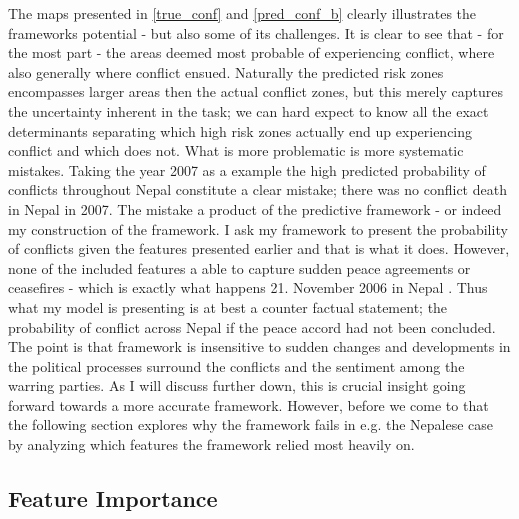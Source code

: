 \documentclass[a4paper]{article}
\begin{document}
The maps presented in \autoref{true_conf} and \autoref{pred_conf_b} clearly illustrates the frameworks potential - but also some of its challenges. It is clear to see that - for the most part - the areas deemed most probable of experiencing conflict, where also generally where conflict ensued. Naturally the predicted risk zones encompasses larger areas then the actual conflict zones, but this merely captures the uncertainty inherent in the task; we can hard expect to know all the exact determinants separating which high risk zones actually end up experiencing conflict and which does not. What is more problematic is more systematic mistakes. Taking the year 2007 as a example the high predicted probability of conflicts throughout Nepal constitute a clear mistake; there was no conflict death in Nepal in 2007. The mistake a product of the predictive framework - or indeed my construction of the framework. I ask my framework to present the probability of conflicts given the features presented earlier and that is what it does. However, none of the included features a able to capture sudden peace agreements or ceasefires - which is exactly what happens 21. November 2006 in Nepal \citep{ohchr2012nepal}. Thus what my model is presenting is at best a counter factual statement; the probability of conflict across Nepal if the peace accord had not been concluded. The point is that framework is insensitive to sudden changes and developments in the political processes surround the conflicts and the sentiment among the warring parties. As I will discuss further down, this is crucial insight going forward towards a more accurate framework. However, before we come to that the following section explores why the framework fails in e.g. the Nepalese case by analyzing which features the framework relied most heavily on.\par

\subsection{Feature Importance}
\end{document}
